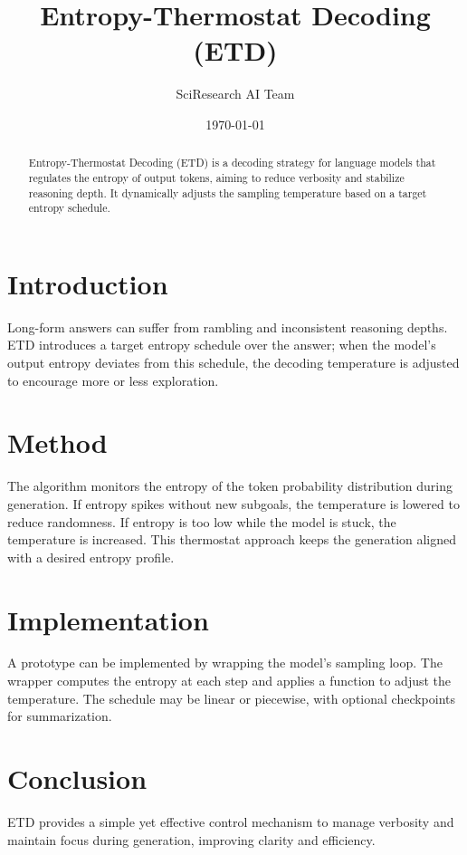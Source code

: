 \documentclass{article}
\title{Entropy-Thermostat Decoding (ETD)}
\author{SciResearch AI Team}
\date{\today}
\begin{document}
\maketitle
\begin{abstract}
Entropy-Thermostat Decoding (ETD) is a decoding strategy for language models that regulates the entropy of output tokens, aiming to reduce verbosity and stabilize reasoning depth. It dynamically adjusts the sampling temperature based on a target entropy schedule.
\end{abstract}
\section{Introduction}
Long-form answers can suffer from rambling and inconsistent reasoning depths. ETD introduces a target entropy schedule over the answer; when the model's output entropy deviates from this schedule, the decoding temperature is adjusted to encourage more or less exploration.
\section{Method}
The algorithm monitors the entropy of the token probability distribution during generation. If entropy spikes without new subgoals, the temperature is lowered to reduce randomness. If entropy is too low while the model is stuck, the temperature is increased. This thermostat approach keeps the generation aligned with a desired entropy profile.
\section{Implementation}
A prototype can be implemented by wrapping the model's sampling loop. The wrapper computes the entropy at each step and applies a function to adjust the temperature. The schedule may be linear or piecewise, with optional checkpoints for summarization.
\section{Conclusion}
ETD provides a simple yet effective control mechanism to manage verbosity and maintain focus during generation, improving clarity and efficiency.
\end{document}
